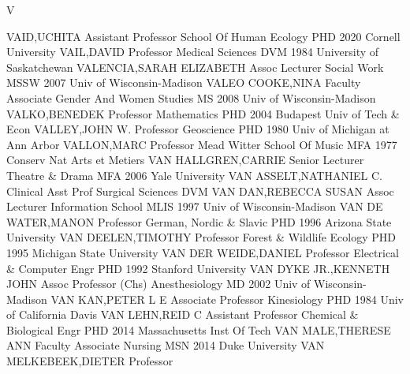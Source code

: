 \documentclass[
]{article}
\begin{document}
V

\textbar{}  \textbar{}

VAID,UCHITA \textbar Assistant Professor \textbar School Of Human
Ecology \textbar PHD 2020 Cornell University \textbar{} 
\textbar VAIL,DAVID \textbar Professor \textbar Medical Sciences
\textbar DVM 1984 University of Saskatchewan \textbar{} 
\textbar VALENCIA,SARAH ELIZABETH \textbar Assoc Lecturer
\textbar Social Work \textbar MSSW 2007 Univ of Wisconsin-Madison
\textbar{}  \textbar VALEO COOKE,NINA \textbar Faculty
Associate \textbar Gender And Women Studies \textbar MS 2008 Univ of
Wisconsin-Madison \textbar{}  \textbar VALKO,BENEDEK
\textbar Professor \textbar Mathematics \textbar PHD 2004 Budapest Univ
of Tech \& Econ \textbar{}  \textbar VALLEY,JOHN W.
\textbar Professor \textbar Geoscience \textbar PHD 1980 Univ of
Michigan at Ann Arbor \textbar{}  \textbar VALLON,MARC
\textbar Professor \textbar Mead Witter School Of Music \textbar MFA
1977 Conserv Nat Arts et Metiers \textbar{}  \textbar VAN
HALLGREN,CARRIE \textbar Senior Lecturer \textbar Theatre \& Drama
\textbar MFA 2006 Yale University \textbar{}  \textbar VAN
ASSELT,NATHANIEL C. \textbar Clinical Asst Prof \textbar Surgical
Sciences \textbar DVM \textbar{}  \textbar VAN DAN,REBECCA
SUSAN \textbar Assoc Lecturer \textbar Information School \textbar MLIS
1997 Univ of Wisconsin-Madison \textbar{}  \textbar VAN DE
WATER,MANON \textbar Professor \textbar German, Nordic \& Slavic
\textbar PHD 1996 Arizona State University \textbar{} 
\textbar VAN DEELEN,TIMOTHY \textbar Professor \textbar Forest \&
Wildlife Ecology \textbar PHD 1995 Michigan State University \textbar{}
 \textbar VAN DER WEIDE,DANIEL \textbar Professor
\textbar Electrical \& Computer Engr \textbar PHD 1992 Stanford
University \textbar{}  \textbar VAN DYKE JR.,KENNETH JOHN
\textbar Assoc Professor (Chs) \textbar Anesthesiology \textbar MD 2002
Univ of Wisconsin-Madison \textbar{}  \textbar VAN KAN,PETER
L E \textbar Associate Professor \textbar Kinesiology \textbar PHD 1984
Univ of California Davis \textbar{}  \textbar VAN LEHN,REID
C \textbar Assistant Professor \textbar Chemical \& Biological Engr
\textbar PHD 2014 Massachusetts Inst Of Tech \textbar{} 
\textbar VAN MALE,THERESE ANN \textbar Faculty Associate
\textbar Nursing \textbar MSN 2014 Duke University \textbar{}
 \textbar VAN MELKEBEEK,DIETER \textbar Professor
\end{document}
